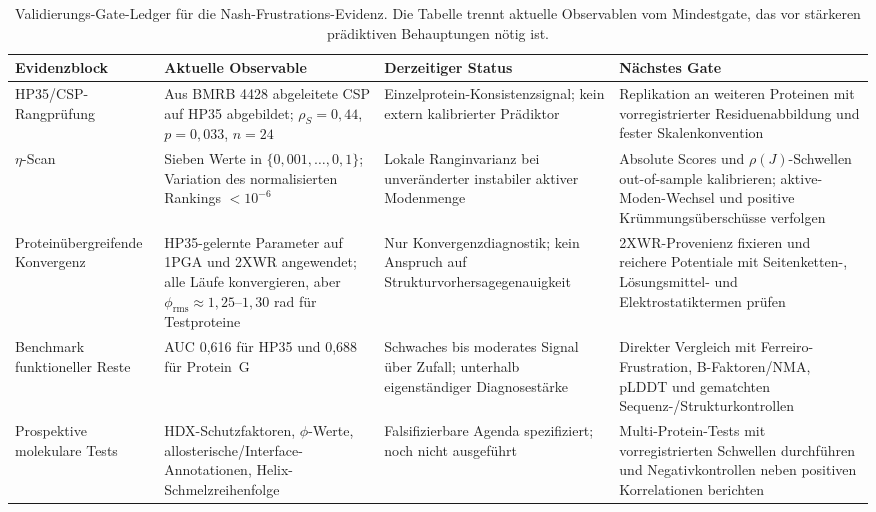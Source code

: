 \documentclass[12pt,a4paper]{article}
\theoremstyle{remark}
\begin{document}
\begin{table}[htbp]
\centering
\caption{Validierungs-Gate-Ledger für die Nash-Frustrations-Evidenz. Die Tabelle trennt aktuelle Observablen vom Mindestgate, das vor stärkeren prädiktiven Behauptungen nötig ist.}
\label{tab:nash-validation-ledger}
\footnotesize
\begin{tabularx}{\textwidth}{@{}L{0.21\textwidth} L{0.25\textwidth} L{0.22\textwidth} Y@{}}
\toprule
\textbf{Evidenzblock} & \textbf{Aktuelle Observable} & \textbf{Derzeitiger Status} & \textbf{Nächstes Gate} \\
\midrule
HP35/CSP-Rangprüfung & Aus BMRB 4428 abgeleitete CSP auf HP35 abgebildet; $\rho_S=0{,}44$, $p=0{,}033$, $n=24$ & Einzelprotein-Konsistenzsignal; kein extern kalibrierter Prädiktor & Replikation an weiteren Proteinen mit vorregistrierter Residuenabbildung und fester Skalenkonvention \\
$\eta$-Scan & Sieben Werte in $\{0{,}001,\ldots,0{,}1\}$; Variation des normalisierten Rankings $<10^{-6}$ & Lokale Ranginvarianz bei unveränderter instabiler aktiver Modenmenge & Absolute Scores und $\rho(J)$-Schwellen out-of-sample kalibrieren; aktive-Moden-Wechsel und positive Krümmungsüberschüsse verfolgen \\
Proteinübergreifende Konvergenz & HP35-gelernte Parameter auf 1PGA und 2XWR angewendet; alle Läufe konvergieren, aber $\phi_{\text{rms}}\approx1{,}25$--$1{,}30$ rad für Testproteine & Nur Konvergenzdiagnostik; kein Anspruch auf Strukturvorhersagegenauigkeit & 2XWR-Provenienz fixieren und reichere Potentiale mit Seitenketten-, Lösungsmittel- und Elektrostatiktermen prüfen \\
Benchmark funktioneller Reste & AUC 0{,}616 für HP35 und 0{,}688 für Protein~G & Schwaches bis moderates Signal über Zufall; unterhalb eigenständiger Diagnosestärke & Direkter Vergleich mit Ferreiro-Frustration, B-Faktoren/NMA, pLDDT und gematchten Sequenz-/Strukturkontrollen \\
Prospektive molekulare Tests & HDX-Schutzfaktoren, $\phi$-Werte, allosterische/Interface-Annotationen, Helix-Schmelzreihenfolge & Falsifizierbare Agenda spezifiziert; noch nicht ausgeführt & Multi-Protein-Tests mit vorregistrierten Schwellen durchführen und Negativkontrollen neben positiven Korrelationen berichten \\
\bottomrule
\end{tabularx}
\end{table}
\end{document}
